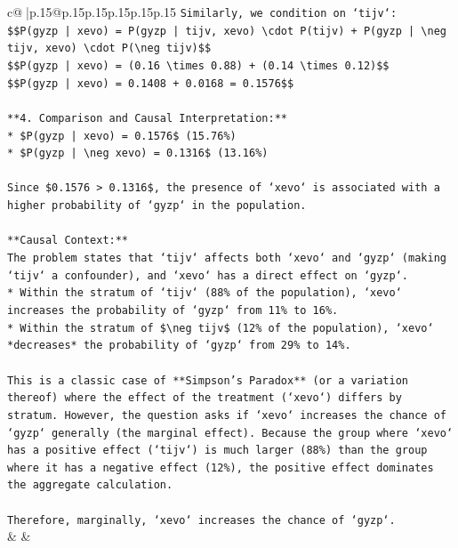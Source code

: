 \documentclass{article}
\begin{document}
{\begin{supertabular}{c@{$\;$}|p{.15\linewidth}@{}p{.15\linewidth}p{.15\linewidth}p{.15\linewidth}p{.15\linewidth}p{.15\linewidth}}
{{{\texttt{Similarly, we condition on `tijv`:} \\
\texttt{\$\$P(gyzp | xevo) = P(gyzp | tijv, xevo) \textbackslash{}cdot P(tijv) + P(gyzp | \textbackslash{}neg tijv, xevo) \textbackslash{}cdot P(\textbackslash{}neg tijv)\$\$} \\
\texttt{\$\$P(gyzp | xevo) = (0.16 \textbackslash{}times 0.88) + (0.14 \textbackslash{}times 0.12)\$\$} \\
\texttt{\$\$P(gyzp | xevo) = 0.1408 + 0.0168 = 0.1576\$\$} \\
\\ 
\texttt{**4. Comparison and Causal Interpretation:**} \\
\texttt{*   \$P(gyzp | xevo) = 0.1576\$ (15.76\%)} \\
\texttt{*   \$P(gyzp | \textbackslash{}neg xevo) = 0.1316\$ (13.16\%)} \\
\\ 
\texttt{Since \$0.1576 > 0.1316\$, the presence of `xevo` is associated with a higher probability of `gyzp` in the population.} \\
\\ 
\texttt{**Causal Context:**} \\
\texttt{The problem states that `tijv` affects both `xevo` and `gyzp` (making `tijv` a confounder), and `xevo` has a direct effect on `gyzp`.} \\
\texttt{*   Within the stratum of `tijv` (88\% of the population), `xevo` increases the probability of `gyzp` from 11\% to 16\%.} \\
\texttt{*   Within the stratum of \$\textbackslash{}neg tijv\$ (12\% of the population), `xevo` *decreases* the probability of `gyzp` from 29\% to 14\%.} \\
\\ 
\texttt{This is a classic case of **Simpson's Paradox** (or a variation thereof) where the effect of the treatment (`xevo`) differs by stratum. However, the question asks if `xevo` increases the chance of `gyzp` generally (the marginal effect). Because the group where `xevo` has a positive effect (`tijv`) is much larger (88\%) than the group where it has a negative effect (12\%), the positive effect dominates the aggregate calculation.} \\
\\ 
\texttt{Therefore, marginally, `xevo` increases the chance of `gyzp`.} \\
            }
        }
    }
    & & \\ \\


\end{supertabular}}
\end{document}
